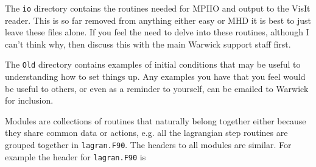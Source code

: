 \documentclass[11pt]{article}
\begin{document}
The \texttt{io} directory contains the routines needed for MPIIO and output to the VisIt reader. This is so far removed from anything either easy or MHD it is best to just leave these files alone. If you feel the need to delve into these routines, although I can't think why, then discuss this with the main Warwick support staff first.

The \texttt{Old} directory contains examples of initial conditions that may be useful to understanding how to set things up. Any examples you have that you feel would be useful to others, or even as a reminder to yourself, can be emailed to Warwick for inclusion. 

Modules are collections of routines that naturally belong together either because they share common data or actions, e.g. all the lagrangian step routines are grouped together in \texttt{lagran.F90}. The headers to all modules are similar. For example the header for \texttt{lagran.F90} is
\end{document}
